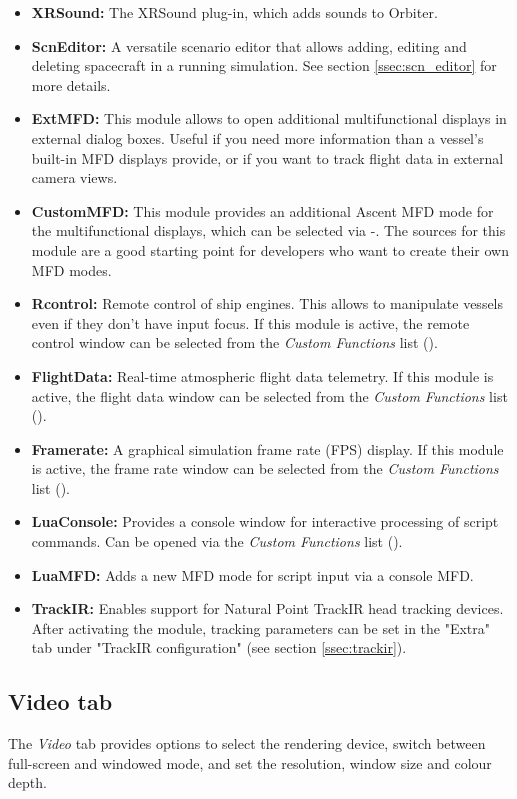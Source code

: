 \documentclass[Orbiter User Manual.tex]{subfiles}
\begin{document}
\begin{itemize}
\item \textbf{XRSound:} The XRSound plug-in, which adds sounds to Orbiter.
\item \textbf{ScnEditor:} A versatile scenario editor that allows adding, editing and deleting spacecraft in a running simulation. See section \ref{ssec:scn_editor} for more details.
\item \textbf{ExtMFD:} This module allows to open additional multifunctional displays in external dialog boxes. Useful if you need more information than a vessel's built-in MFD displays provide, or if you want to track flight data in external camera views.
\item \textbf{CustomMFD:} This module provides an additional Ascent MFD mode for the multifunctional displays, which can be selected via \Shift{}-\Shift{}. The sources for this module are a good starting point for developers who want to create their own MFD modes.
\item \textbf{Rcontrol:} Remote control of ship engines. This allows to manipulate vessels even if they don't have input focus. If this module is active, the remote control window can be selected from the \textit{Custom Functions} list (\Ctrl{}).
\item \textbf{FlightData:} Real-time atmospheric flight data telemetry. If this module is active, the flight data window can be selected from the \textit{Custom Functions} list (\Ctrl{}).
\item \textbf{Framerate:} A graphical simulation frame rate (FPS) display. If this module is active, the frame rate window can be selected from the \textit{Custom Functions} list (\Ctrl{}).
\item \textbf{LuaConsole:} Provides a console window for interactive processing of script commands. Can be opened via the \textit{Custom Functions} list (\Ctrl{}).
\item \textbf{LuaMFD:} Adds a new MFD mode for script input via a console MFD.
\item \textbf{TrackIR:} Enables support for Natural Point TrackIR head tracking devices. After activating the module, tracking parameters can be set in the "Extra" tab under "TrackIR configuration" (see section \ref{ssec:trackir}).
\end{itemize}


\subsection{Video tab}
\label{ssec:launchpad_video}
The \textit{Video} tab provides options to select the rendering device, switch between full-screen and windowed mode, and set the resolution, window size and colour depth.
\end{document}
